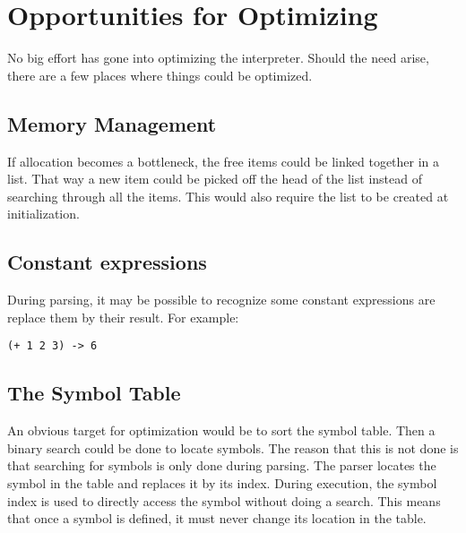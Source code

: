 \documentclass[10pt, openany]{book}
\begin{document}
\section{Opportunities for Optimizing}
No big effort has gone into optimizing the interpreter.  Should the need arise, there are a few places where things could be optimized.

\subsection{Memory Management}
If allocation becomes a bottleneck, the free items could be linked together in a list.  That way a new item could be picked off the head of the list instead of searching through all the items.  This would also require the list to be created at initialization.

\subsection{Constant expressions}
During parsing, it may be possible to recognize some constant expressions are replace them by their result.  For example:
\lstset{language=[Tiny]Lisp}
\begin{lstlisting}
(+ 1 2 3) -> 6
\end{lstlisting}

\subsection{The Symbol Table}
An obvious target for optimization would be to sort the symbol table.  Then a binary search could be done to locate symbols.  The reason that this is not done is that searching for symbols is only done during parsing.  The parser locates the symbol in the table and replaces it by its index.  During execution, the symbol index is used to directly access the symbol without doing a search.  This means that once a symbol is defined, it must never change its location in the table.
\end{document}
